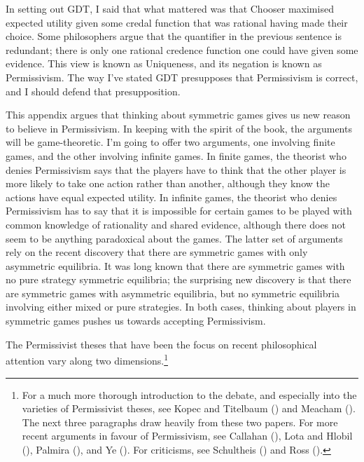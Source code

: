 \documentclass[
  12pt,
  letterpaper,
  DIV=11,
  numbers=noendperiod]{scrreprt}
\begin{document}
In setting out GDT, I said that what mattered was that Chooser maximised
expected utility given some credal function that was rational having
made their choice. Some philosophers argue that the quantifier in the
previous sentence is redundant; there is only one rational credence
function one could have given some evidence. This view is known as
Uniqueness, and its negation is known as Permissivism. The way I've
stated GDT presupposes that Permissivism is correct, and I should defend
that presupposition.

This appendix argues that thinking about symmetric games gives us new
reason to believe in Permissivism. In keeping with the spirit of the
book, the arguments will be game-theoretic. I'm going to offer two
arguments, one involving finite games, and the other involving infinite
games. In finite games, the theorist who denies Permissivism says that
the players have to think that the other player is more likely to take
one action rather than another, although they know the actions have
equal expected utility. In infinite games, the theorist who denies
Permissivism has to say that it is impossible for certain games to be
played with common knowledge of rationality and shared evidence,
although there does not seem to be anything paradoxical about the games.
The latter set of arguments rely on the recent discovery that there are
symmetric games with only asymmetric equilibria. It was long known that
there are symmetric games with no pure strategy symmetric equilibria;
the surprising new discovery is that there are symmetric games with
asymmetric equilibria, but no symmetric equilibria involving either
mixed or pure strategies. In both cases, thinking about players in
symmetric games pushes us towards accepting Permissivism.

The Permissivist theses that have been the focus on recent philosophical
attention vary along two dimensions.\footnote{For a much more thorough
  introduction to the debate, and especially into the varieties of
  Permissivist theses, see Kopec and Titelbaum
  () and Meacham
  (). The next three paragraphs draw
  heavily from these two papers. For more recent arguments in favour of
  Permissivism, see Callahan (), Lota
  and Hlobil (), Palmira
  (), and Ye
  (). For criticisms, see Schultheis
  () and Ross
  ().}
\end{document}
